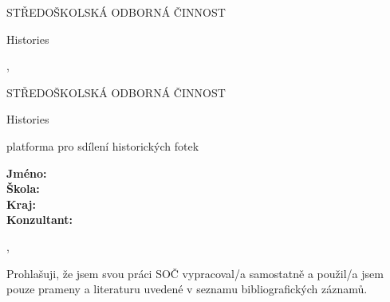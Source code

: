 
\begin{titlepage}
    \bfseries{ %
        \begin{center}
            \LARGE{STŘEDOŠKOLSKÁ ODBORNÁ ČINNOST} 
            \vspace{14pt}
            \large{\specialization} 

            \vspace{0.4 \textheight}

            \LARGE{ %
                Histories
            }%

            \vspace{0.4\textheight}
        \end{center}
        
        \noindent\Large{\name}

        \noindent\Large{\district{}  \city, \publicationYear} %
        
            
    } %
\end{titlepage}

\cleardoublepage%
{\bfseries %
    \begin{center}
        \LARGE{STŘEDOŠKOLSKÁ ODBORNÁ ČINNOST}

        \vspace{14pt}
        {\large \specialization}

        \vspace{0.3 \textheight}

        \LARGE{ %
        Histories
        }

        \LARGE{ %
        platforma pro sdílení historických fotek
        }%

        \vspace{0.24\textheight}
    \end{center}  
}%
{\Large %
    \noindent\textbf{Jméno:} \name\\
    \textbf{Škola:} \school\\
    \textbf{Kraj:} \district\\
    \textbf{Konzultant:} \consultant\\
} %

\noindent \city, \publicationYear\cleardoublepage{}  %

\noindent Prohlašuji, že jsem svou práci SOČ vypracoval/a samostatně a použil/a jsem pouze prameny a literaturu uvedené v seznamu bibliografických záznamů.

